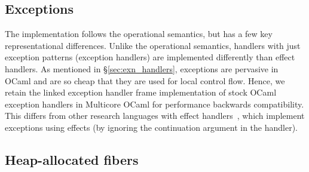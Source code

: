 \documentclass[sigplan,10pt,review,anonymous]{acmart}\settopmatter{printfolios=true,printccs=false,printacmref=false}
\begin{document}
\vspace{-2mm}
\subsection{Exceptions}

The implementation follows the operational semantics, but has a few key
representational differences. Unlike the operational semantics, handlers with
just exception patterns (exception handlers) are implemented differently than
effect handlers. As mentioned in \S\ref{sec:exn_handlers}, exceptions are
pervasive in OCaml and are so cheap that they are used for local control flow.
Hence, we retain the linked exception handler frame implementation of stock
OCaml exception handlers in Multicore OCaml for performance backwards
compatibility. This differs from other research languages with effect
handlers~\cite{Hillerstrom20,Frank,Eff}, which implement exceptions using
effects (by ignoring the continuation argument in the handler).

\vspace{-2mm}
\subsection{Heap-allocated fibers}
\end{document}
